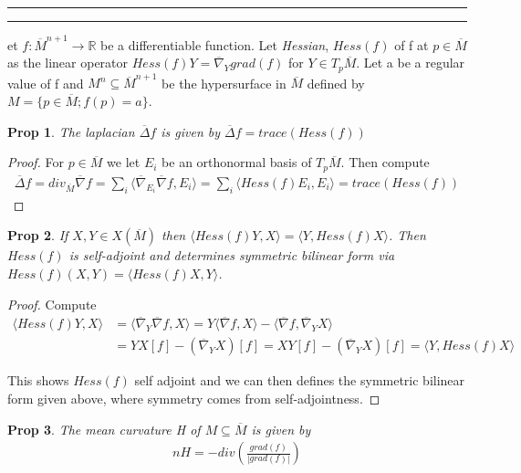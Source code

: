 \documentclass[11pt]{article}
\newcommand{\R}{\mathbb{R}}
\newcommand{\question}[2] {\vspace{.25in} \hrule\vspace{0.5em}
\noindent{\bf #1: #2} \vspace{0.5em}
\hrule \vspace{.10in}}
\newtheorem{prop}{Prop}
\begin{document}
\question{Question 4}

Let $f : \overline{M}^{n+1} \to \R$ be a differentiable function. Let \textit{Hessian}, $Hess(f)$ of f at $p \in \overline{M}$ as the linear operator $Hess(f)Y = \overline{\nabla}_Y grad(f)$ for $Y \in T_p \overline{M}$. Let a be a regular value of f and $M^n \subseteq \overline{M}^{n+1}$ be the hypersurface in $\overline{M}$ defined by $M = \{p \in \overline{M};f(p) = a\}$. 

\begin{prop}
	The laplacian $\overline{\Delta} f$ is given by $\overline{\Delta} f = trace(Hess(f))$
\end{prop}

\begin{proof}
	For $p \in \overline{M}$ we let $E_i$ be an orthonormal basis of $T_p\overline{M}$. Then compute 
	\begin{align*}
		\overline{\Delta} f = div_{\overline{M}} \overline{\nabla} f = \sum_i \langle \overline{\nabla}_{E_i} \overline{\nabla} f, E_i \rangle = \sum_i \langle Hess(f) E_i,E_i\rangle = trace(Hess(f))
	\end{align*}
\end{proof}

\begin{prop}
	If $X,Y \in X(\overline{M})$ then $\langle Hess(f) Y,X\rangle = \langle Y,Hess(f) X\rangle$. Then $Hess(f)$ is self-adjoint and determines symmetric bilinear form via $Hess(f)(X,Y) = \langle Hess(f)X,Y\rangle$.
\end{prop}

\begin{proof}
	Compute
	\begin{align*}
		\langle Hess(f) Y,X \rangle &= \langle \overline{\nabla}_Y \overline{\nabla} f, X \rangle = Y \langle \overline{\nabla} f,X\rangle - \langle \overline{\nabla} f,\overline{\nabla}_Y X\rangle \\
		&= YX[f] - (\overline{\nabla}_Y X)[f]  = XY[f] - (\overline{\nabla}_Y X)[f] = \langle Y,Hess(f)X\rangle
	\end{align*}

	This shows $Hess(f)$ self adjoint and we can then defines the symmetric bilinear form given above, where symmetry comes from self-adjointness.
\end{proof}

\begin{prop}
	The mean curvature H of $M \subseteq \overline{M}$ is given by
	\begin{align*}
		nH = -div(\frac{grad(f)}{|grad(f)|})
	\end{align*}
\end{prop}
\end{document}
